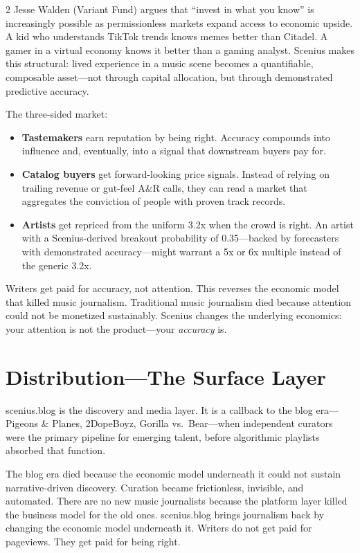 \documentclass[9pt,oneside]{amsart}
\begin{document}
\begin{multicols}{2}
Jesse Walden (Variant Fund) argues that ``invest in what you know'' is increasingly possible as permissionless markets expand access to economic upside. A kid who understands TikTok trends knows memes better than Citadel. A gamer in a virtual economy knows it better than a gaming analyst. Scenius makes this structural: lived experience in a music scene becomes a quantifiable, composable asset---not through capital allocation, but through demonstrated predictive accuracy.

The three-sided market:

\begin{itemize}[nosep]
  \item \textbf{Tastemakers} earn reputation by being right. Accuracy compounds into influence and, eventually, into a signal that downstream buyers pay for.
  \item \textbf{Catalog buyers} get forward-looking price signals. Instead of relying on trailing revenue or gut-feel A\&R calls, they can read a market that aggregates the conviction of people with proven track records.
  \item \textbf{Artists} get repriced from the uniform 3.2x when the crowd is right. An artist with a Scenius-derived breakout probability of 0.35---backed by forecasters with demonstrated accuracy---might warrant a 5x or 6x multiple instead of the generic 3.2x.
\end{itemize}

Writers get paid for accuracy, not attention. This reverses the economic model that killed music journalism. Traditional music journalism died because attention could not be monetized sustainably. Scenius changes the underlying economics: your attention is not the product---your \emph{accuracy} is.

\section{Distribution---The Surface Layer}

scenius.blog is the discovery and media layer. It is a callback to the blog era---Pigeons \& Planes, 2DopeBoyz, Gorilla vs.\ Bear---when independent curators were the primary pipeline for emerging talent, before algorithmic playlists absorbed that function.

The blog era died because the economic model underneath it could not sustain narrative-driven discovery. Curation became frictionless, invisible, and automated. There are no new music journalists because the platform layer killed the business model for the old ones. scenius.blog brings journalism back by changing the economic model underneath it. Writers do not get paid for pageviews. They get paid for being right.


\end{multicols}
\end{document}
